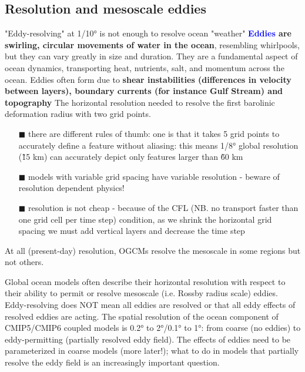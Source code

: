 \subsection{Resolution and mesoscale eddies}
"Eddy-resolving" at 1/10° is not enough to resolve ocean "weather"
\textbf{\textcolor{Blue}{Eddies} are swirling, circular movements of water in the ocean}, resembling whirlpools, but they can vary greatly in size and duration. They are a fundamental aspect of ocean dynamics, transporting heat, nutrients, salt, and momentum across the ocean. Eddies often form due to \textbf{shear instabilities (differences in velocity between layers), boundary currents (for instance Gulf Stream) and topography}
The horizontal resolution needed to resolve the first barolinic deformation radius with two grid points.
\begin{itemize}
	\item[$\blacksquare$] there are different rules of thumb: one is that it takes 5 grid points to accurately define a feature without aliasing: this means 1/8° global resolution (\~15 km) can accurately depict only features larger than \~60 km
	\item[$\blacksquare$] models with variable grid spacing have variable resolution - beware of resolution dependent physics!
	\item[$\blacksquare$] resolution is not cheap - because of the CFL (NB. no transport faster than one grid cell per time step) condition, as we shrink the horizontal grid spacing we must add vertical layers and decrease the time step
\end{itemize}
At all (present-day) resolution, OGCMs resolve the mesoscale in some regions but not others.

Global ocean models often describe their horizontal resolution with respect to their ability to permit or resolve mesoscale (i.e. Rossby radius scale) eddies.
Eddy-resolving does NOT mean all eddies are resolved or that all eddy effects of resolved eddies are acting. The spatial resolution of the ocean component of CMIP5/CMIP6 coupled models is 0.2° to 2°/0.1° to 1°: from coarse (no eddies) to eddy-permitting (partially resolved eddy field). The effects of eddies need to be parameterized in coarse models (more later!); what to do in models that partially resolve the eddy field is an increasingly important question.

